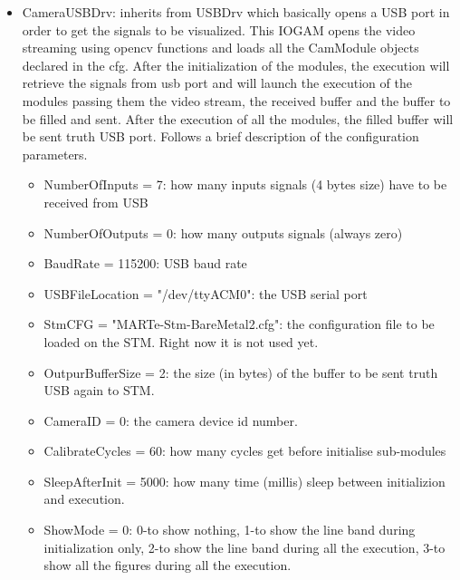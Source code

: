 \begin{itemize}
\item CameraUSBDrv: inherits from USBDrv which basically opens a USB port in order to get the signals to be visualized. This IOGAM opens the video streaming using opencv functions and loads all the CamModule objects declared in the cfg. After the initialization of the modules, the execution will retrieve the signals from usb port and will launch the execution of the modules passing them the video stream, the received buffer and the buffer to be filled and sent. After the execution of all the modules, the filled buffer will be sent truth USB port. Follows a brief description of the configuration parameters.
\begin{itemize}
\item NumberOfInputs  = 7: how many inputs signals (4 bytes size) have to be received from USB
\item NumberOfOutputs = 0: how many outputs signals (always zero)
\item BaudRate = 115200: USB baud rate
\item USBFileLocation = "/dev/ttyACM0": the USB serial port
\item StmCFG = "MARTe-Stm-BareMetal2.cfg": the configuration file to be loaded on the STM. Right now it is not used yet.
\item OutpurBufferSize = 2: the size (in bytes) of the buffer to be sent truth USB again to STM.
\item CameraID = 0: the camera device id number.
\item CalibrateCycles = 60: how many cycles get before initialise sub-modules
\item SleepAfterInit = 5000: how many time (millis) sleep between initializion and execution.
\item ShowMode = 0: 0-to show nothing, 1-to show the line band during initialization only, 2-to show the line band during all the execution, 3-to show all the figures during all the execution.
\end{itemize}
\end{itemize}